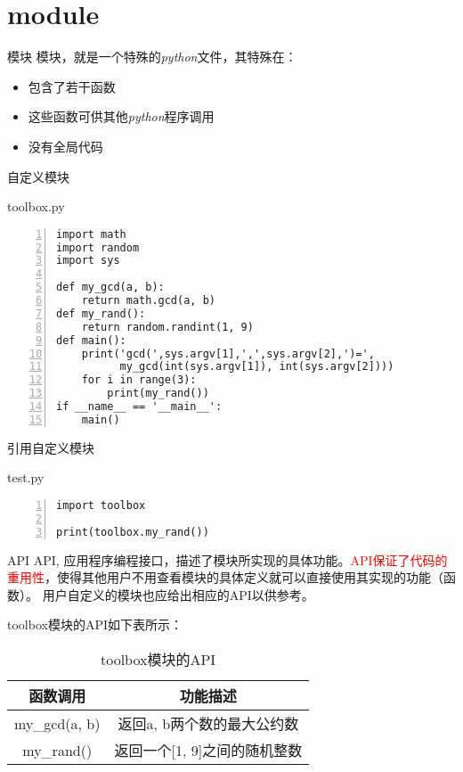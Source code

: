 \documentclass{beamer}
\begin{document}
\section{module}
\begin{frame}[fragile]{模块}
模块，就是一个特殊的\textit{python}文件，其特殊在：
\begin{itemize}
\item 包含了若干函数
\item 这些函数可供其他\textit{python}程序调用
\item 没有全局代码
\end{itemize}

\end{frame}
\begin{frame}[fragile]{自定义模块}
\begin{block}{toolbox.py}
\begin{Verbatim}[numbers=left,frame=single,rulecolor=\color{red}]
import math
import random
import sys

def my_gcd(a, b):
    return math.gcd(a, b)
def my_rand():
    return random.randint(1, 9)
def main():
    print('gcd(',sys.argv[1],',',sys.argv[2],')=',
          my_gcd(int(sys.argv[1]), int(sys.argv[2])))
    for i in range(3):
        print(my_rand())
if __name__ == '__main__':
    main()
\end{Verbatim}
\end{block}
\end{frame}

\begin{frame}[fragile]{引用自定义模块}
\begin{block}{test.py}
\begin{Verbatim}[numbers=left,frame=single,rulecolor=\color{red}]
import toolbox

print(toolbox.my_rand())
\end{Verbatim}
\end{block}
\end{frame}

\begin{frame}[fragile]{API}
API, 应用程序编程接口，描述了模块所实现的具体功能。\textcolor{red}{API保证了代码的重用性}，使得其他用户不用查看模块的具体定义就可以直接使用其实现的功能（函数）。
用户自定义的模块也应给出相应的API以供参考。

toolbox模块的API如下表所示：
\begin{table}[htp]
\caption{toolbox模块的API}
\begin{center}
\begin{tabular}{c|c}
\toprule
\textbf{函数调用}&\textbf{功能描述}\\
\midrule
my\_gcd(a, b)&返回a, b两个数的最大公约数\\
my\_rand()&返回一个[1, 9]之间的随机整数\\
\bottomrule
\end{tabular}
\end{center}

\end{table}%

\end{frame}
\end{document}
